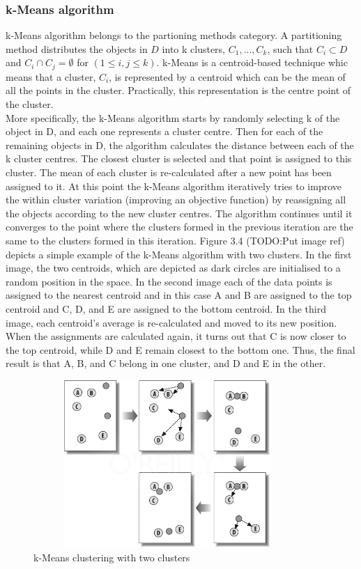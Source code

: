 \subsubsection{k-Means algorithm}
k-Means algorithm belongs to the partioning methods category. A partitioning method distributes the objects in $D$  into k clusters, $C_1, ..., C_k$, such that $C_i \subset D$ and $C_i \cap C_j = \emptyset$ for $(1 \leq i, j \leq k)$. k-Means is a centroid-based technique whic means that a cluster, $C_i$, is represented by a centroid which can be the mean of all the points in the cluster. Practically, this representation is the centre point of the cluster. \\
More specifically, the k-Means algorithm starts by randomly selecting k of the object in D, and each one represents a cluster centre. Then for each of the remaining objects in D, the algorithm calculates the distance between each of the k cluster centres. The closest cluster is selected and that point is assigned to this cluster. The mean of each cluster is re-calculated after a new point has been assigned to it. At this point the k-Means algorithm iteratively tries to improve the within cluster variation (improving an objective function) by reassigning all the objects according to the new cluster centres. The algorithm continues until it converges to the point where the clusters formed in the previous iteration are the same to the clusters formed in this iteration. Figure 3.4 (TODO:Put image ref) depicts a simple example of the k-Means algorithm with two clusters. In the first image, the two centroids, which are depicted as dark circles are initialised to a random position in the space. In the second image each of the data points is assigned to the nearest centroid and in this case A and B are assigned to the top centroid and C, D, and E are assigned to the bottom centroid. In the third image, each centroid's average is re-calculated and moved to its new position. When the assignments are calculated again, it turns out that C is now closer to the top centroid, while D and E remain closest to the bottom one. Thus, the final result is that A, B, and C belong in one cluster, and D and E in the other. \\

\begin{figure}[!htbp]
  \begin{center}
    \includegraphics[height=2.5in, width=4in]{kmeans-example}
    \caption{k-Means clustering with two clusters}
    \label{kMeansExample}
  \end{center}
\end{figure} 
 
